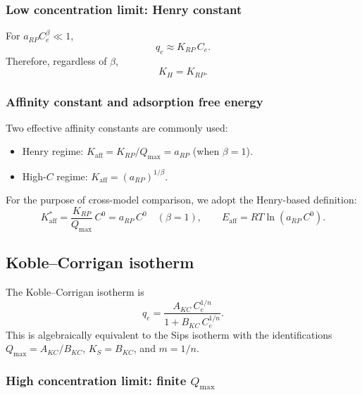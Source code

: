 \documentclass[journal=jacsat,manuscript=article]{achemso}
\begin{document}
\subsubsection{Low concentration limit: Henry constant}

For $a_{RP}C_e^{\beta} \ll 1$,
\begin{equation}
	q_e \approx K_{RP}\, C_e.
\end{equation}
Therefore, regardless of $\beta$,
\begin{equation}
	\boxed{K_H = K_{RP}.}
\end{equation}

\subsubsection{Affinity constant and adsorption free energy}

Two effective affinity constants are commonly used:
\begin{itemize}
	\item Henry regime: $K_{\mathrm{aff}} = K_{RP}/Q_{\max} = a_{RP}$ (when $\beta=1$).
	\item High-$C$ regime: $K_{\mathrm{aff}} = (a_{RP})^{1/\beta}$.
\end{itemize}
For the purpose of cross-model comparison, we adopt the Henry-based definition:
\begin{equation}
	\boxed{
		K_{\mathrm{aff}}^{\ast} = \frac{K_{RP}}{Q_{\max}}\, C^0
		= a_{RP}\, C^0 \quad (\beta=1),
		\qquad
		E_{\mathrm{aff}} = RT\ln(a_{RP}\, C^0).
	}
\end{equation}

\subsection{Koble--Corrigan isotherm}
\label{sec:si_koble_corrigan}

The Koble--Corrigan isotherm is
\begin{equation}
	q_e = \frac{A_{KC}\, C_e^{1/n}}{1 + B_{KC}\, C_e^{1/n}}.
	\label{eq:si_koble_corrigan}
\end{equation}
This is algebraically equivalent to the Sips isotherm with the identifications
$Q_{\max} = A_{KC}/B_{KC}$, $K_S = B_{KC}$, and $m = 1/n$.

\subsubsection{High concentration limit: finite $Q_{\max}$}
\end{document}
